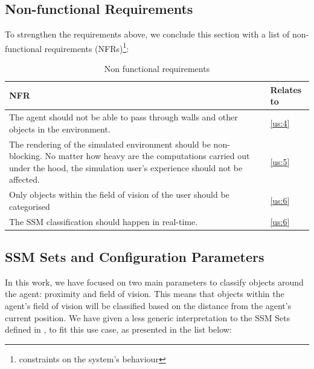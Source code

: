 \subsection{Non-functional Requirements}\label{subsec:nfrs}
To strengthen the requirements above, we conclude this section with a list of non-functional requirements (NFRs)\footnote{constraints on the system's behaviour}:
\begin{table}[H]
	\begin{center}
		\small \begin{tabular*}{1.1\columnwidth}{p{10cm}p{1.5cm}} 
			\\ \hline \hline
			NFR & Relates to \\ \hline \hline

		 	The agent should not be able to pass through walls and other objects in the environment. & \ref{us:4}\\ \hline

		 	The rendering of the simulated environment should be non-blocking. No matter how heavy are the computations carried out under the hood, the simulation user's experience should not be affected. & \ref{us:5}\\ \hline

		 	Only objects within the field of vision of the user should be categorised & \ref{us:6}\\ \hline

		 	The SSM classification should happen in real-time. & \ref{us:6}\\ \hline

		\end{tabular*}
		
		\caption{Non functional requirements}
		\label{table:nfr}
	\end{center}
\end{table}

\subsection{SSM Sets and Configuration Parameters}\label{subsec:ssm_params}
In this work, we have focused on two main parameters to classify objects around the agent: proximity and field of vision. This means that objects within the agent's field of vision will be classified based on the distance from the agent's current position. We have given a less generic interpretation to the SSM Sets defined in \cite{pederson2011situative}, to fit this use case, as presented in the list below:
